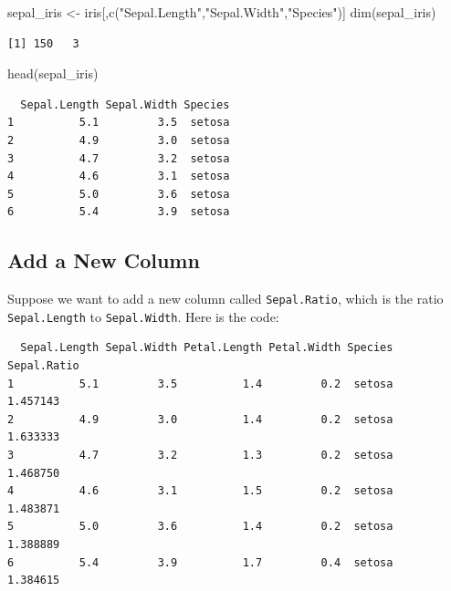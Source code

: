 \documentclass[
  letterpaper,
  DIV=11,
  numbers=noendperiod]{scrreprt}
\newenvironment{Shaded}{\begin{snugshade}}{\end{snugshade}}
\newcommand{\FunctionTok}[1]{\textcolor[rgb]{0.28,0.35,0.67}{#1}}
\newcommand{\NormalTok}[1]{\textcolor[rgb]{0.00,0.23,0.31}{#1}}
\newcommand{\OtherTok}[1]{\textcolor[rgb]{0.00,0.23,0.31}{#1}}
\newcommand{\SpecialCharTok}[1]{\textcolor[rgb]{0.37,0.37,0.37}{#1}}
\newcommand{\StringTok}[1]{\textcolor[rgb]{0.13,0.47,0.30}{#1}}
\begin{document}
\begin{Shaded}
\begin{Highlighting}[]
\NormalTok{sepal\_iris }\OtherTok{\textless{}{-}}\NormalTok{ iris[,}\FunctionTok{c}\NormalTok{(}\StringTok{"Sepal.Length"}\NormalTok{,}\StringTok{"Sepal.Width"}\NormalTok{,}\StringTok{"Species"}\NormalTok{)]}
\FunctionTok{dim}\NormalTok{(sepal\_iris)}
\end{Highlighting}
\end{Shaded}

\begin{verbatim}
[1] 150   3
\end{verbatim}

\begin{Shaded}
\begin{Highlighting}[]
\FunctionTok{head}\NormalTok{(sepal\_iris)}
\end{Highlighting}
\end{Shaded}

\begin{verbatim}
  Sepal.Length Sepal.Width Species
1          5.1         3.5  setosa
2          4.9         3.0  setosa
3          4.7         3.2  setosa
4          4.6         3.1  setosa
5          5.0         3.6  setosa
6          5.4         3.9  setosa
\end{verbatim}

\subsection{Add a New Column}\label{add-a-new-column}

Suppose we want to add a new column called \texttt{Sepal.Ratio}, which
is the ratio \texttt{Sepal.Length} to \texttt{Sepal.Width}. Here is the
code:

\begin{Shaded}
\end{Shaded}

\begin{verbatim}
  Sepal.Length Sepal.Width Petal.Length Petal.Width Species Sepal.Ratio
1          5.1         3.5          1.4         0.2  setosa    1.457143
2          4.9         3.0          1.4         0.2  setosa    1.633333
3          4.7         3.2          1.3         0.2  setosa    1.468750
4          4.6         3.1          1.5         0.2  setosa    1.483871
5          5.0         3.6          1.4         0.2  setosa    1.388889
6          5.4         3.9          1.7         0.4  setosa    1.384615
\end{verbatim}
\end{document}
